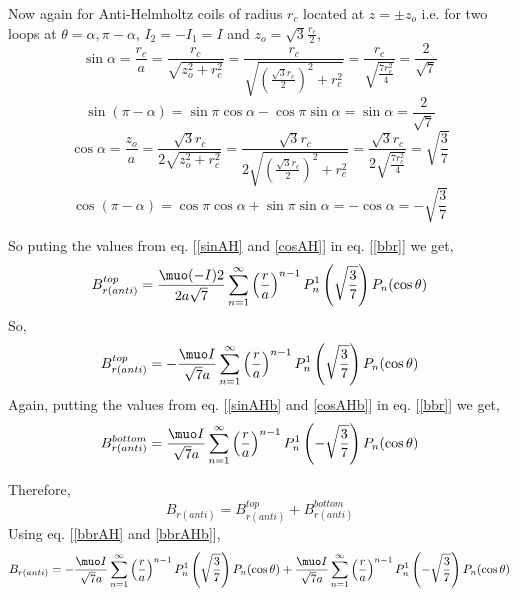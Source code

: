 Now again for Anti-Helmholtz coils of radius \(r_c\) located at \(z=\pm z_o\) i.e. for two loops at \(\theta=\alpha, \pi-\alpha \), \(I_2=-I_1=I\) and \(z_o=\sqrt{3}\frac{r_c}{2}\),
\begin{equation}\label{sinAH}
\sin\alpha=\frac{r_c}{a}=\frac{r_c}{\sqrt{z_o^2+r_c^2}}=\frac{r_c}{\sqrt{\left(\frac{\sqrt{3}r_c}{2}\right)^2+r_c^2}}=\frac{r_c}{\sqrt{\frac{7r_c^2}{4}}}=\frac{2}{\sqrt{7}}
\end{equation}
\begin{equation}\label{sinAHb}
\sin(\pi-\alpha)=\sin\pi\cos\alpha-\cos\pi\sin\alpha=\sin\alpha=\frac{2}{\sqrt{7}}
\end{equation}
\begin{equation}\label{cosAH}
\cos\alpha=\frac{z_o}{a}=\frac{\sqrt{3}r_c}{2\sqrt{z_o^2+r_c^2}}=\frac{\sqrt{3}r_c}{2\sqrt{\left(\frac{\sqrt{3}r_c}{2}\right)^2+r_c^2}}=\frac{\sqrt{3}r_c}{2\sqrt{\frac{7r_c^2}{4}}}=\sqrt{\frac{3}{7}}
\end{equation}
\begin{equation}\label{cosAHb}
\cos(\pi-\alpha)=\cos\pi\cos\alpha+\sin\pi\sin\alpha=-\cos\alpha=-\sqrt{\frac{3}{7}}
\end{equation}

So puting the values from eq. [\ref{sinAH} and \ref{cosAH}] in eq. [\ref{bbr}] we get,
$$B_{r(anti)}^{top}=\frac{\muo (-I) 2}{2a\sqrt{7}}\sum_{n=1}^{\infty} \left(\frac{r}{a}\right)^{n-1}P_n^1\left(\sqrt{\frac{3}{7}}\right) P_n(\cos\theta)$$
So,
\begin{equation}\label{bbrAH}
B_{r(anti)}^{top}=-\frac{\muo I }{\sqrt{7}a}\sum_{n=1}^{\infty} \left(\frac{r}{a}\right)^{n-1}P_n^1\left(\sqrt{\frac{3}{7}}\right) P_n(\cos\theta)
\end{equation}
Again, putting the values from eq. [\ref{sinAHb} and \ref{cosAHb}] in eq. [\ref{bbr}] we get,
\begin{equation}\label{bbrAHb}
B_{r(anti)}^{bottom}=\frac{\muo I }{\sqrt{7}a}\sum_{n=1}^{\infty} \left(\frac{r}{a}\right)^{n-1}P_n^1\left(-\sqrt{\frac{3}{7}}\right) P_n(\cos\theta)
\end{equation}


Therefore,
$$B_{r(anti)}=B_{r(anti)}^{top}+B_{r(anti)}^{bottom}$$
Using eq. [\ref{bbrAH} and \ref{bbrAHb}],
$$B_{r(anti)}=-\frac{\muo I }{\sqrt{7}a}\sum_{n=1}^{\infty} \left(\frac{r}{a}\right)^{n-1}P_n^1\left(\sqrt{\frac{3}{7}}\right) P_n(\cos\theta)+\frac{\muo I }{\sqrt{7}a}\sum_{n=1}^{\infty} \left(\frac{r}{a}\right)^{n-1}P_n^1\left(-\sqrt{\frac{3}{7}}\right) P_n(\cos\theta)$$

